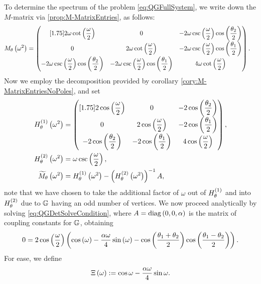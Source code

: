 To determine the spectrum of the problem \eqref{eq:QGFullSystem}, we write down the $M$-matrix via \ref{prop:M-MatrixEntries}, as follows:
\begin{align*}
	M_{\theta}\left( \omega^2 \right) &=
	\begin{pmatrix}[1.75]
		2\omega\cot\left( \dfrac{\omega}{2} \right) & 0 & -2\omega\csc\left( \dfrac{\omega}{2} \right)\cos\left( \dfrac{\theta_2}{2} \right) \\
		0 & 2\omega\cot\left( \dfrac{\omega}{2} \right) & -2\omega\csc\left( \dfrac{\omega}{2} \right)\cos\left( \dfrac{\theta_1}{2} \right) \\
		-2\omega\csc\left( \dfrac{\omega}{2} \right)\cos\left( \dfrac{\theta_2}{2} \right) & -2\omega\csc\left( \dfrac{\omega}{2} \right)\cos\left( \dfrac{\theta_1}{2} \right) & 4\omega\cot\left( \dfrac{\omega}{2} \right)
	\end{pmatrix}.
\end{align*}
Now we employ the decomposition provided by corollary \ref{cory:M-MatrixEntriesNoPoles}, and set
\begin{align*}
	H_\theta^{(1)}\left( \omega^2 \right) &=
	\begin{pmatrix}[1.75]
		2\cos\left( \dfrac{\omega}{2} \right) & 0 & -2\cos\left( \dfrac{\theta_2}{2} \right) \\
		0 & 2\cos\left( \dfrac{\omega}{2} \right) & -2\cos\left( \dfrac{\theta_1}{2} \right) \\
		-2\cos\left( \dfrac{\theta_2}{2} \right) & -2\cos\left( \dfrac{\theta_1}{2} \right) & 4\cos\left( \dfrac{\omega}{2} \right)
	\end{pmatrix}, \\
	H_\theta^{(2)}\left( \omega^2 \right) &= \omega\csc\left( \frac{\omega}{2} \right), \\
	\widetilde{M}_\theta\left( \omega^2 \right) &= H_\theta^{(1)}\left( \omega^2 \right) - \left( H_\theta^{(2)}\left( \omega^2 \right) \right)^{-1}A,
\end{align*}
note that we have chosen to take the additional factor of $\omega$ out of $H_\theta^{(1)}$ and into $H^{(2)}_\theta$ due to $\mathbb{G}$ having an odd number of vertices.
We now proceed analytically by solving \eqref{eq:QGDetSolveCondition}, where $A=\mathrm{diag}\left( 0,0,\alpha \right)$ is the matrix of coupling constants for $\mathbb{G}$, obtaining
\begin{align} \label{eq:ExampleThickVertexSolution}
	0 = 2\cos\left( \frac{\omega}{2} \right)
	\left(  \cos\left( \omega \right) - \frac{\alpha\omega}{4}\sin\left( \omega \right) - \cos\left( \frac{\theta_1+\theta_2}{2} \right)\cos\left( \frac{\theta_1-\theta_2}{2} \right)  \right).
\end{align}
For ease, we define
\begin{align*}
	\Xi\left( \omega \right) := \cos\omega - \frac{\alpha\omega}{4}\sin\omega.
\end{align*}
